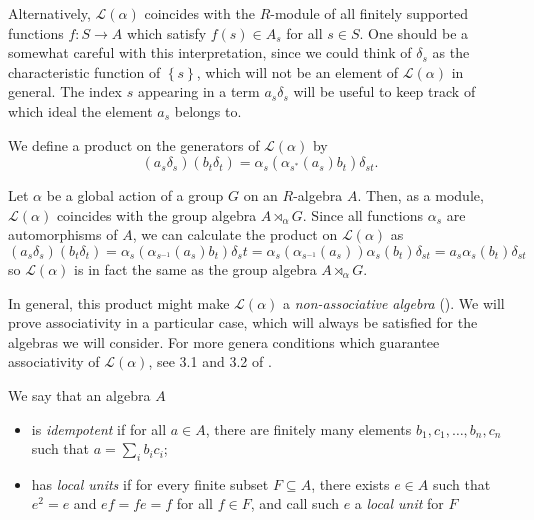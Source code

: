 \begin{remark}
Alternatively, $\mathscr{L}(\alpha)$ coincides with the $R$-module of all finitely supported functions $f:S\to A$ which satisfy $f(s)\in A_s$ for all $s\in S$. One should be a somewhat careful with this interpretation, since we could think of $\delta_s$ as the characteristic function of $\left\{s\right\}$, which will not be an element of $\mathscr{L}(\alpha)$ in general. The index $s$ appearing in a term $a_s\delta_s$ will be useful to keep track of which ideal the element $a_s$ belongs to.
\end{remark}

We define a product on the generators of $\mathscr{L}(\alpha)$ by
\[(a_s \delta_s)(b_t \delta_t) = \alpha_{s}(\alpha_{s^*}(a_s) b_t) \delta_{st}.\]

\begin{example}
Let $\alpha$ be a global action of a group $G$ on an $R$-algebra $A$. Then, as a module, $\mathscr{L}(\alpha)$ coincides with the group algebra $A\rtimes_{\alpha} G$. Since all functions $\alpha_s$ are automorphisms of $A$, we can calculate the product on $\mathscr{L}(\alpha)$ as
\[(a_s\delta_s)(b_t\delta_t)=\alpha_s(\alpha_{s^{-1}}(a_s)b_t)\delta_st=\alpha_s(\alpha_{s^{-1}}(a_s))\alpha_s(b_t)\delta_{st}=a_s\alpha_s(b_t)\delta_{st}\]
so $\mathscr{L}(\alpha)$ is in fact the same as the group algebra $A\rtimes_{\alpha} G$.
\end{example}

In general, this product might make $\mathscr{L}(\alpha)$ a \emph{non-associative algebra} (\cite[Example~3.5]{MR2115083}). We will prove associativity in a particular case, which will always be satisfied for the algebras we will consider. For more genera conditions which guarantee associativity of $\mathscr{L}(\alpha)$, see 3.1 and 3.2 of \cite{MR2115083}.


\begin{definition}
We say that an algebra $A$
\begin{itemize}
\item is \emph{idempotent} if for all $a\in A$, there are finitely many elements $b_1,c_1,\ldots,b_n,c_n$ such that $a=\sum_i b_ic_i$;
\item has \emph{local units} if for every finite subset $F\subseteq A$, there exists $e\in A$ such that $e^2=e$ and $ef=fe=f$ for all $f\in F$, and call such $e$ a \emph{local unit} for $F$
\end{itemize}
\end{definition}


